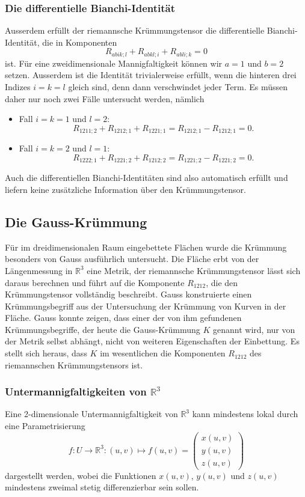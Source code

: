 \subsubsection{Die differentielle Bianchi-Identität}
Ausserdem erfüllt der riemannsche Krümmungstensor die differentielle
Bianchi-Identität, die in Komponenten
\[
R_{abik;l}
+
R_{abkl;i}
+
R_{abli;k}
=
0
\]
ist.
Für eine zweidimensionale Mannigfaltigkeit können wir $a=1$ und $b=2$
setzen.
Ausserdem ist die Identität trivialerweise erfüllt, wenn die hinteren
drei Indizes $i=k=l$ gleich sind, denn dann verschwindet jeder Term.
Es müssen daher nur noch zwei Fälle untersucht werden, nämlich
\begin{itemize}
\item Fall $i=k=1$ und $l=2$:
\[
R_{1211;2} + R_{1212;1} + R_{1221;1} 
=
R_{1212;1}-R_{1212;1} = 0.
\]
\item Fall $i=k=2$ und $l=1$:
\[
R_{1222;1} + R_{1221;2} + R_{1212;2}  
=
R_{1221;2} - R_{1221;2}
=
0.
\]
\end{itemize}
Auch die differentiellen Bianchi-Identitäten sind also automatisch
erfüllt und liefern keine zusätzliche Information über den Krümmungstensor.

%
%
\subsection{Die Gauss-Krümmung}
Für im dreidimensionalen Raum eingebettete Flächen wurde die Krümmung
besonders von Gauss ausführlich untersucht.
Die Fläche erbt von der Längenmessung in $\mathbb{R}^3$ eine
Metrik, der riemannsche Krümmungstensor lässt sich daraus berechnen
und führt auf die Komponente $R_{1212}$, die den Krümmungstensor vollständig
beschreibt.
Gauss konstruierte einen Krümmungsbegriff aus der Untersuchung der
Krümmung von Kurven in der Fläche.
Gauss konnte zeigen, dass einer der von ihm gefundenen Krümmungsbegriffe,
der heute die Gauss-Krümmung $K$ genannt wird, nur von der Metrik selbst
abhängt, nicht von weiteren Eigenschaften der Einbettung.
Es stellt sich heraus, dass  $K$ im wesentlichen die Komponenten $R_{1212}$
des riemannschen Krümmungstensors ist.

\subsubsection{Untermannigfaltigkeiten von $\mathbb{R}^3$}
Eine 2-dimensionale Untermannigfaltigkeit von $\mathbb{R}^3$ kann
mindestens lokal durch eine Parametrisierung
\[
f\colon U\to \mathbb{R}^3
:
(u,v)\mapsto f(u,v)
=
\begin{pmatrix}
x(u,v)\\
y(u,v)\\
z(u,v)
\end{pmatrix}
\]
dargestellt werden, wobei die Funktionen $x(u,v)$, $y(u,v)$ und $z(u,v)$
mindestens zweimal stetig differenzierbar sein sollen.

